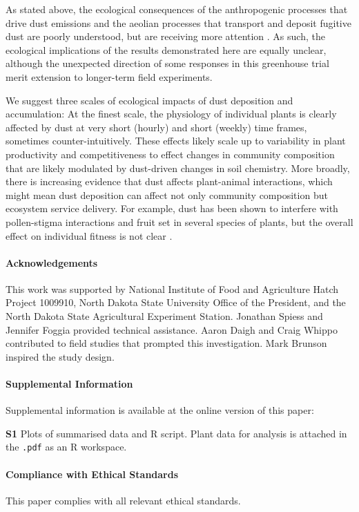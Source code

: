 \documentclass{svjour3}
\begin{document}
As stated above, the ecological consequences of the anthropogenic processes that drive dust emissions and the  aeolian processes that transport and deposit fugitive dust are poorly understood, but are receiving more attention \citep{field2010}. 
As such, the ecological implications of the results demonstrated here are equally unclear, although the unexpected direction of some responses in this greenhouse trial merit extension to longer-term field experiments. 

We suggest three scales of ecological impacts of dust deposition and accumulation: At the finest scale, the physiology of individual plants is clearly affected by dust at very short (hourly) and short (weekly) time frames, sometimes counter-intuitively. 
These effects likely scale up to variability in plant productivity and competitiveness to effect changes in community composition that are likely modulated by dust-driven changes in soil chemistry. 
More broadly, there is increasing evidence that dust affects plant-animal interactions, which might mean dust deposition can affect not only community composition but ecosystem service delivery. 
For example, dust has been shown to interfere with pollen-stigma interactions and fruit set in several species of plants, but the overall effect on individual fitness is not clear \citep{waser2017, zhang2019}. 


\paragraph{Acknowledgements}
This work was supported by National Institute of Food and Agriculture Hatch Project 1009910, North Dakota State University Office of the President, and the North Dakota State Agricultural Experiment Station.
Jonathan Spiess and Jennifer Foggia provided technical assistance. 
Aaron Daigh and Craig Whippo contributed to field studies that prompted this investigation.
Mark Brunson inspired the study design.

\paragraph{Supplemental Information}

Supplemental information is available at the online version of this paper:

\textbf{S1} Plots of summarised data and \textsf{R} script.
Plant data for analysis is attached in the \texttt{.pdf} as an \textsf{R} workspace.

\paragraph{Compliance with Ethical Standards}
This paper complies with all relevant ethical standards. 

      
 
\end{document}
